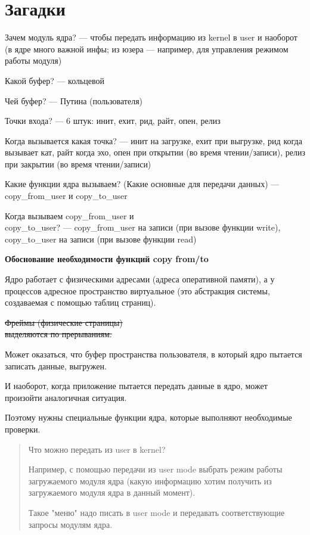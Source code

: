 \section*{Загадки}

Зачем модуль ядра? --- чтобы передать информацию из kernel в user и наоборот (в ядре много важной инфы; из юзера --- например, для управления режимом работы модуля)

Какой буфер? --- кольцевой

Чей буфер? --- Путина (пользователя)

Точки входа? --- 6 штук: инит, ехит, рид, райт, опен, релиз

Когда вызывается какая точка? --- инит на загрузке, ехит при выгрузке, рид когда вызывает кат, райт когда эхо, опен при открытии (во время чтении/записи), релиз при закрытии (во время чтении/записи)

Какие функции ядра вызываем? (Какие основные для передачи данных) --- copy\_from\_user и copy\_to\_user

Когда вызываем copy\_from\_user и \\ copy\_to\_user? --- copy\_from\_user на записи (при вызове функции write), \\ copy\_to\_user на записи (при вызове функции read)

\textbf{Обоснование необходимости функций copy from/to}

Ядро работает с физическими адресами (адреса оперативной памяти), а у процессов адресное пространство виртуальное (это абстракция системы, создаваемая с помощью таблиц страниц).

\sout{Фреймы (физические страницы) \\ выделяются по прерываниям.}

Может оказаться, что буфер пространства пользователя, в который ядро пытается записать данные, выгружен.

И наоборот, когда приложение пытается передать данные в ядро, может произойти аналогичная ситуация.

Поэтому нужны специальные функции ядра, которые выполняют необходимые проверки.

\begin{quote}
Что можно передать из user в kernel?

Например, с помощью передачи из user mode выбрать режим работы загружаемого модуля ядра (какую информацию хотим получить из загружаемого модуля ядра в данный момент).

Такое "меню" надо писать в user mode и передавать соответствующие запросы модулям ядра.
\end{quote}


	
	
